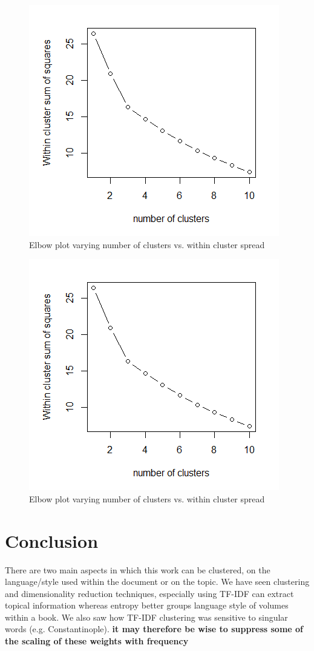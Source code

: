 \documentclass[a4paper,10pt, twocolumn]{article}
\begin{document}
\begin{figure}
	\includegraphics[width=0.7\linewidth]{elbow.png}
	\centering
	\caption{Elbow plot varying number of clusters vs. within cluster spread}
	\label{fig:elbow}
\end{figure}



\begin{figure}
	\includegraphics[width=0.7\linewidth]{elbow.png}
	\centering
	\caption{Elbow plot varying number of clusters vs. within cluster spread}
	\label{fig:elbow}
\end{figure} 
 
\section{Conclusion}
There are two main aspects in which this work can be clustered, on the language/style used within the document or on the topic. We have seen clustering and dimensionality reduction techniques, especially using TF-IDF can extract topical information whereas entropy better groups language style of volumes within a book. We also saw how TF-IDF clustering was sensitive to singular words (e.g. Constantinople). \textbf{it may therefore be wise to suppress some of the scaling of these weights with frequency}
\end{document}
